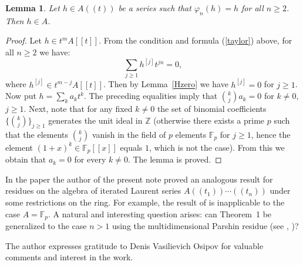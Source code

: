 \documentclass[11pt,a4paper]{article}
\theoremstyle{plain}
\newtheorem{lemma}{Lemma}
\newcommand{\Z}{\mathbb{Z}}
\begin{document}
\begin{lemma}\label{fixed}
Let $h\in A((t))$ be a series such that $\varphi_{n}(h) = h$ for all $n\geq 2$. Then $h\in A$.
\end{lemma}
\begin{proof}
Let $h\in t^{m}A[[t]]$. From the condition and formula (\ref{taylor}) above, for all $n\geq 2$ we have:
\begin{equation}\label{sumeqzero}
\sum_{j\geq 1} h^{[j]}t^{jn} = 0,
\end{equation}
where $h^{[j]}\in t^{m-j}A[[t]]$. Then by Lemma~\ref{Hzero} we have $h^{[j]}=0$ for $j\geq 1$. Now put $h = \sum_{k} a_k t^{k}$. The preceding equalities imply that $\binom{k}{j}a_{k}=0$ for $k\neq 0$, $j\geq 1$. Next, note that for any fixed $k\neq 0$ the set of binomial coefficients $\{\binom{k}{j}\}_{j\geq 1}$ generates the unit ideal in $\Z$ (otherwise there exists a prime $p$ such that the elements $\binom{k}{j}$ vanish in the field of $p$ elements $\mathbb{F}_{p}$ for $j\geq 1$, hence the element $(1+x)^{k}\in \mathbb{F}_{p}[[x]]$ equals $1$, which is not the case). From this we obtain that $a_k = 0$ for every $k\neq 0$. The lemma is proved.
\end{proof}

In the paper \cite{Lev26} the author of the present note proved an analogous result for residues on the algebra of iterated Laurent series $A((t_1))\cdots((t_n))$ under some restrictions on the ring. For example, the result of \cite{Lev26} is inapplicable to the case $A = \mathbb{F}_{p}$. A natural and interesting question arises: can Theorem~1 be generalized to the case $n>1$ using the multidimensional Parshin residue (see \cite{Par84}, \cite{GorOsi16})?

The author expresses gratitude to Denis Vasilievich Osipov for valuable comments and interest in the work.
\end{document}
